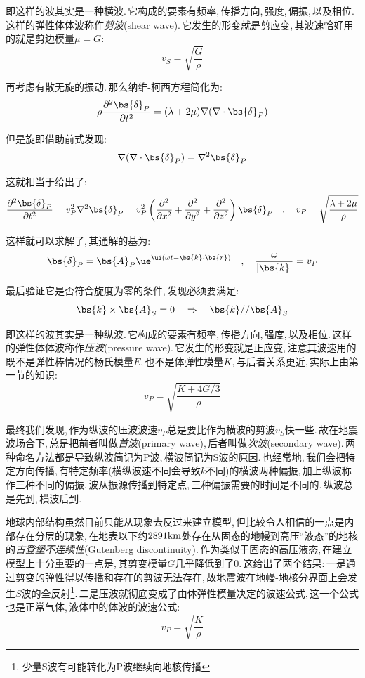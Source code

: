 即这样的波其实是一种横波.\,它构成的要素有频率,\,传播方向,\,强度,\,偏振,\,以及相位.\,这样的弹性体体波称作\emph{剪波}(shear wave).\,它发生的形变就是剪应变,\,其波速恰好用的就是剪边模量$\mu=G$:
\[v_S=\sqrt{\frac{G}{\rho}}\]

再考虑有散无旋的振动.\,那么纳维-柯西方程简化为:
\[\rho\frac{\partial^2 \bs{\delta}_P}{\partial t^2}=(\lambda+2\mu)\nabla(\nabla\cdot \bs{\delta}_P)\]

但是旋即借助前式发现:
\[\nabla(\nabla\cdot \bs{\delta}_P)=\nabla^2\bs{\delta}_P\]

这就相当于给出了:
\[\frac{\partial^2 \bs{\delta}_P}{\partial t^2}=v_P^2\nabla^2\bs{\delta}_P=v_P^2\left(\frac{\partial^2 }{\partial x^2}+\frac{\partial^2 }{\partial y^2}+\frac{\partial^2 }{\partial z^2}\right)\bs{\delta}_P\quad ,\quad v_P=\sqrt{\frac{\lambda+2\mu}{\rho}}\]

这样就可以求解了,\,其通解的基为:
\[\bs{\delta}_P=\bs{A}_P\ue^{\ui(\omega t- \bs{k}\cdot\bs{r})}\quad,\quad \frac{\omega}{|\bs{k}|}=v_P\]

最后验证它是否符合旋度为零的条件,\,发现必须要满足:
\[\bs{k}\times\bs{A}_S=0\quad\Rightarrow\quad \bs{k}//\bs{A}_S\]

即这样的波其实是一种纵波.\,它构成的要素有频率,\,传播方向,\,强度,\,以及相位.\,这样的弹性体体波称作\emph{压波}(pressure wave).\,它发生的形变就是正应变,\,注意其波速用的既不是弹性棒情况的杨氏模量$E$,\,也不是体弹性模量$K$,\,与后者关系更近,\,实际上由第一节的知识:
\[v_P=\sqrt{\frac{K+4G/3}{\rho}}\]

最终我们发现,\,作为纵波的压波波速$v_P$总是要比作为横波的剪波$v_S$快一些.\,故在地震波场合下,\,总是把前者叫做\emph{首波}(primary wave),\,后者叫做\emph{次波}(secondary wave).\,两种命名方法都是导致纵波简记为P波,\,横波简记为S波的原因.\,也经常地,\,我们会把特定方向传播,\,有特定频率(横纵波速不同会导致$k$不同)的横波两种偏振,\,加上纵波称作三种不同的偏振,\,波从振源传播到特定点,\,三种偏振需要的时间是不同的.\,纵波总是先到,\,横波后到.

地球内部结构虽然目前只能从现象去反过来建立模型,\,但比较令人相信的一点是内部存在分层的现象,\,在地表以下约$2891{\rm km}$处存在从固态的地幔到高压``液态''的地核的\emph{古登堡不连续性}(Gutenberg discontinuity).\,作为类似于固态的高压液态,\,在建立模型上十分重要的一点是,\,其剪变模量$G$几乎降低到了$0$.\,这给出了两个结果:\,一是通过剪变的弹性得以传播和存在的剪波无法存在,\,故地震波在地幔-地核分界面上会发生$S$波的全反射\footnote{少量S波有可能转化为P波继续向地核传播}.\,二是压波就彻底变成了由体弹性模量决定的波速公式,\,这一个公式也是正常气体,\,液体中的体波的波速公式:
\[v_P=\sqrt{\frac{K}{\rho}}\]

